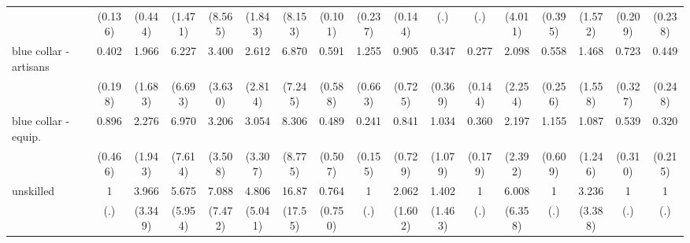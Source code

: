 {\begin{tabular}{l*{16}{c}}
                    &     (0.136)         &     (0.444)         &     (1.471)         &     (8.565)         &     (1.843)         &     (8.153)         &     (0.101)         &     (0.237)         &     (0.144)         &         (.)         &         (.)         &     (4.011)         &     (0.395)         &     (1.572)         &     (0.209)         &     (0.238)         \\
[1em]
blue collar - artisans&       0.402         &       1.966         &       6.227         &       3.400         &       2.612         &       6.870         &       0.591         &       1.255         &       0.905         &       0.347         &       0.277\sym{*}  &       2.098         &       0.558         &       1.468         &       0.723         &       0.449         \\
                    &     (0.198)         &     (1.683)         &     (6.693)         &     (3.630)         &     (2.814)         &     (7.245)         &     (0.588)         &     (0.663)         &     (0.725)         &     (0.369)         &     (0.144)         &     (2.254)         &     (0.256)         &     (1.558)         &     (0.327)         &     (0.248)         \\
[1em]
blue collar - equip.&       0.896         &       2.276         &       6.970         &       3.206         &       3.054         &       8.306\sym{*}  &       0.489         &       0.241\sym{*}  &       0.841         &       1.034         &       0.360\sym{*}  &       2.197         &       1.155         &       1.087         &       0.539         &       0.320         \\
                    &     (0.466)         &     (1.943)         &     (7.614)         &     (3.508)         &     (3.307)         &     (8.775)         &     (0.507)         &     (0.155)         &     (0.729)         &     (1.079)         &     (0.179)         &     (2.392)         &     (0.609)         &     (1.246)         &     (0.310)         &     (0.215)         \\
[1em]
unskilled           &           1         &       3.966         &       5.675         &       7.088         &       4.806         &       16.87\sym{**} &       0.764         &           1         &       2.062         &       1.402         &           1         &       6.008         &           1         &       3.236         &           1         &           1         \\
                    &         (.)         &     (3.349)         &     (5.954)         &     (7.472)         &     (5.041)         &     (17.55)         &     (0.750)         &         (.)         &     (1.602)         &     (1.463)         &         (.)         &     (6.358)         &         (.)         &     (3.388)         &         (.)         &         (.)         \\

\end{tabular}}
